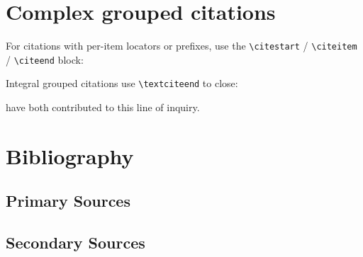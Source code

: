 \documentclass{article}
\begin{document}
\section{Complex grouped citations}

For citations with per-item locators or prefixes, use the
\verb|\citestart| / \verb|\citeitem| / \verb|\citeend| block:

\citestart
\citeend

Integral grouped citations use \verb|\textciteend| to close:

\citestart
\textciteend
have both contributed to this line of inquiry.

\section{Bibliography}


\subsection*{Primary Sources}
\printcitumbibliography[type=manuscript]

\subsection*{Secondary Sources}
\printcitumbibliography[not-type=manuscript]
\end{document}
